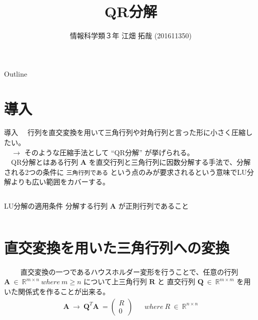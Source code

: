 \documentclass[dvipdfmx,10pt,presentation]{beamer}
\author{情報科学類３年 江畑 拓哉 (201611350)}
\date{}
\title{QR分解}
\begin{document}
\maketitle
\begin{frame}{Outline}
\tableofcontents
\end{frame}


\section{導入}
\label{sec:org8d87b3d}
\begin{frame}[fragile,label={sec:org08adfe5}]{導入}
 　行列を直交変換を用いて三角行列や対角行列と言った形に小さく圧縮したい。\\
　\(\rightarrow\) そのような圧縮手法として ``QR分解'' が挙げられる。\\

　QR分解とはある行列 \(\bm{A}\) を直交行列と三角行列に因数分解する手法で、分解される2つの条件に \texttt{三角行列である} という点のみが要求されるという意味でLU分解よりも広い範囲をカバーする。\\
\begin{columns}
\begin{column}{1.00\columnwidth}
\begin{block}{LU分解の適用条件}
分解する行列 \(\bm{A}\) が正則行列であること\\
\end{block}
\end{column}
\end{columns}
\end{frame}

\section{直交変換を用いた三角行列への変換}
\label{sec:orgddf72be}
\begin{frame}[label={sec:org69587c4}]{　}
　直交変換の一つであるハウスホルダー変形を行うことで、任意の行列 \(\bm{A}\ \in \ \mathbb{R}^{m \times n}\ where\ m \geq n\) について上三角行列 \(\bm{R}\) と 直交行列 \(\bm{Q}\ \in\ \mathbb{R}^{m \times m}\) を用いた関係式を作ることが出来る。\\

\begin{align*}
\bm{A}\ \rightarrow\ \bm{Q}^T\bm{A}\ = \begin{pmatrix}R \\ 0\end{pmatrix}
&& where\ R\ \in\ \mathbb{R}^{n\times n}
\end{align*}
\end{frame}
\end{document}
